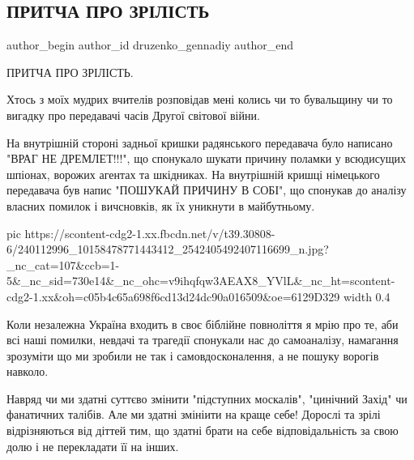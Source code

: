  
 
 
 
 
 
\subsection{ПРИТЧА ПРО ЗРІЛІСТЬ}
\label{sec:24_08_2021.fb.druzenko_gennadiy.1.pritcha_zrelost}
 
\ifcmt
 author_begin
   author_id druzenko_gennadiy
 author_end
\fi

ПРИТЧА ПРО ЗРІЛІСТЬ.

Хтось з моїх мудрих вчителів розповідав мені колись чи то бувальщину чи то
вигадку про передавачі часів Другої світової війни. 

На внутрішній стороні задньої кришки радянського передавача було написано "ВРАГ
НЕ ДРЕМЛЕТ!!!", що спонукало шукати причину поламки у всюдисущих шпіонах,
ворожих агентах та шкідниках. На внутрішній кришці німецького передавача був
напис "ПОШУКАЙ ПРИЧИНУ В СОБІ", що спонукав до аналізу власних помилок і
вичсновків, як їх уникнути в майбутньому.

\ifcmt
  pic https://scontent-cdg2-1.xx.fbcdn.net/v/t39.30808-6/240112996_10158478771443412_2542405492407116699_n.jpg?_nc_cat=107&ccb=1-5&_nc_sid=730e14&_nc_ohc=v9ihqfqw3AEAX8_YVlL&_nc_ht=scontent-cdg2-1.xx&oh=c05b4c65a698f6cd13d24dc90a016509&oe=6129D329
  width 0.4
\fi

Коли незалежна Україна входить в своє біблійне повноліття я мрію про те, аби
всі наші помилки, невдачі та трагедії спонукали нас до самоаналізу, намагання
зрозуміти що ми зробили не так і самовдосконалення, а не пошуку ворогів
навколо.

Навряд чи ми здатні суттєво змінити "підступних москалів", "цинічний Захід" чи
фанатичних талібів. Але ми здатні змініити на краще себе! Дорослі та зрілі
відрізняються від діттей тим, що здатні брати на себе відповідальність за свою
долю і не перекладати її на інших.

